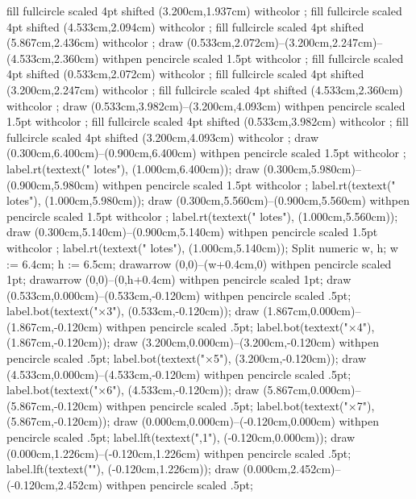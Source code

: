 {{fill fullcircle scaled 4pt shifted (3.200cm,1.937cm) withcolor ;
fill fullcircle scaled 4pt shifted (4.533cm,2.094cm) withcolor ;
fill fullcircle scaled 4pt shifted (5.867cm,2.436cm) withcolor ;
draw (0.533cm,2.072cm)--(3.200cm,2.247cm)--(4.533cm,2.360cm) withpen pencircle scaled 1.5pt withcolor ;
fill fullcircle scaled 4pt shifted (0.533cm,2.072cm) withcolor ;
fill fullcircle scaled 4pt shifted (3.200cm,2.247cm) withcolor ;
fill fullcircle scaled 4pt shifted (4.533cm,2.360cm) withcolor ;
draw (0.533cm,3.982cm)--(3.200cm,4.093cm) withpen pencircle scaled 1.5pt withcolor ;
fill fullcircle scaled 4pt shifted (0.533cm,3.982cm) withcolor ;
fill fullcircle scaled 4pt shifted (3.200cm,4.093cm) withcolor ;
draw (0.300cm,6.400cm)--(0.900cm,6.400cm) withpen pencircle scaled 1.5pt withcolor ;
label.rt(textext(" lotes"), (1.000cm,6.400cm));
draw (0.300cm,5.980cm)--(0.900cm,5.980cm) withpen pencircle scaled 1.5pt withcolor ;
label.rt(textext(" lotes"), (1.000cm,5.980cm));
draw (0.300cm,5.560cm)--(0.900cm,5.560cm) withpen pencircle scaled 1.5pt withcolor ;
label.rt(textext(" lotes"), (1.000cm,5.560cm));
draw (0.300cm,5.140cm)--(0.900cm,5.140cm) withpen pencircle scaled 1.5pt withcolor ;
label.rt(textext(" lotes"), (1.000cm,5.140cm));
\stopMPcode}{Split}
{\startMPcode
numeric w, h; w := 6.4cm; h := 6.5cm;
drawarrow (0,0)--(w+0.4cm,0) withpen pencircle scaled 1pt;
drawarrow (0,0)--(0,h+0.4cm) withpen pencircle scaled 1pt;
draw (0.533cm,0.000cm)--(0.533cm,-0.120cm) withpen pencircle scaled .5pt;
label.bot(textext("×3"), (0.533cm,-0.120cm));
draw (1.867cm,0.000cm)--(1.867cm,-0.120cm) withpen pencircle scaled .5pt;
label.bot(textext("×4"), (1.867cm,-0.120cm));
draw (3.200cm,0.000cm)--(3.200cm,-0.120cm) withpen pencircle scaled .5pt;
label.bot(textext("×5"), (3.200cm,-0.120cm));
draw (4.533cm,0.000cm)--(4.533cm,-0.120cm) withpen pencircle scaled .5pt;
label.bot(textext("×6"), (4.533cm,-0.120cm));
draw (5.867cm,0.000cm)--(5.867cm,-0.120cm) withpen pencircle scaled .5pt;
label.bot(textext("×7"), (5.867cm,-0.120cm));
draw (0.000cm,0.000cm)--(-0.120cm,0.000cm) withpen pencircle scaled .5pt;
label.lft(textext(",1"), (-0.120cm,0.000cm));
draw (0.000cm,1.226cm)--(-0.120cm,1.226cm) withpen pencircle scaled .5pt;
label.lft(textext(""), (-0.120cm,1.226cm));
draw (0.000cm,2.452cm)--(-0.120cm,2.452cm) withpen pencircle scaled .5pt;
}}
